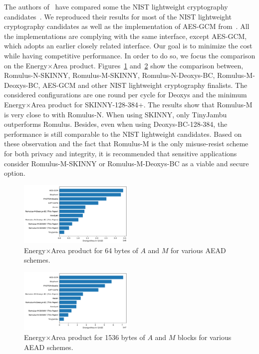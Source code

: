 \documentclass[conference]{IEEEtran}
\begin{document}
The authors of~\cite{benchmarking} have compared some the NIST lightweight cryptography candidates~\cite{turan2021status}. We reproduced their results for most of the NIST lightweight cryptography candidates as well as the implementation of AES-GCM from~\cite{gmu}. All the implementations are complying with the same interface, except AES-GCM, which adopts an earlier closely related interface. Our goal is to minimize the cost while having competitive performance. In order to do so, we focus the comparison on the Energy$\times$Area product. Figures~\ref{fig:energy_area_64} and~\ref{fig:energy_area_1536} show the comparison between, Romulus-N-SKINNY, Romulus-M-SKINNY, Romulus-N-Deoxys-BC, Romulus-M-Deoxys-BC, AES-GCM and other NIST lightweight cryptography finalists. The considered configurations are one round per cycle for Deoxys and the minimum Energy$\times$Area product for SKINNY-128-384+. The results show that Romulus-M is very close to with Romulus-N. When using SKINNY, only TinyJambu outperforms Romulus. Besides, even when using Deoxys-BC-128-384, the performance is still comparable to the NIST lightweight candidates. Based on these observation and the fact that Romulus-M is the only misuse-resist scheme for both privacy and integrity, it is recommended that sensitive applications consider Romulus-M-SKINNY or Romulus-M-Deoxys-BC as a viable and secure option.

\begin{figure}[!h]
  \centering
  \includegraphics[width=0.49\textwidth]{figures/withM_energy_area64_bar_65.pdf}
  \caption{Energy$\times$Area product for 64 bytes of $A$ and $M$ for various AEAD schemes.}\label{fig:energy_area_64}
\end{figure}

\begin{figure}[!h]
  \centering
  \includegraphics[width=0.49\textwidth]{figures/withM_energy_area1536_bar_65.pdf}
  \caption{Energy$\times$Area product for 1536 bytes of $A$ and $M$ blocks for various AEAD schemes.}\label{fig:energy_area_1536}
\end{figure}
\end{document}
